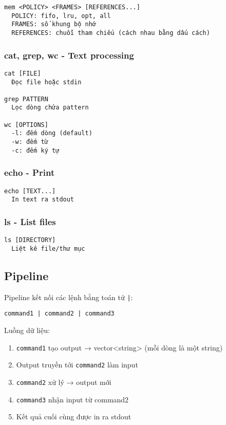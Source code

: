 \begin{lstlisting}
mem <POLICY> <FRAMES> [REFERENCES...]
  POLICY: fifo, lru, opt, all
  FRAMES: số khung bộ nhớ
  REFERENCES: chuỗi tham chiếu (cách nhau bằng dấu cách)
\end{lstlisting}

\subsubsection{cat, grep, wc - Text processing}

\begin{lstlisting}
cat [FILE]
  Đọc file hoặc stdin

grep PATTERN
  Lọc dòng chứa pattern

wc [OPTIONS]
  -l: đếm dòng (default)
  -w: đếm từ
  -c: đếm ký tự
\end{lstlisting}

\subsubsection{echo - Print}

\begin{lstlisting}
echo [TEXT...]
  In text ra stdout
\end{lstlisting}

\subsubsection{ls - List files}

\begin{lstlisting}
ls [DIRECTORY]
  Liệt kê file/thư mục
\end{lstlisting}

\subsection{Pipeline}

Pipeline kết nối các lệnh bằng toán tử \verb+|+:

\begin{lstlisting}
command1 | command2 | command3
\end{lstlisting}

Luồng dữ liệu:
\begin{enumerate}[leftmargin=1.5cm]
  \item \texttt{command1} tạo output → vector<string> (mỗi dòng là một string)
  \item Output truyền tới \texttt{command2} làm input
  \item \texttt{command2} xử lý → output mới
  \item \texttt{command3} nhận input từ command2
  \item Kết quả cuối cùng được in ra stdout
\end{enumerate}

